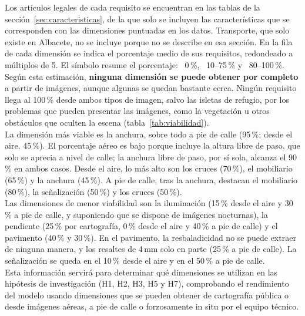 Los artículos legales de cada requisito se encuentran en las tablas de la sección~\ref{sec:caracteristicas}, de la que solo se incluyen las características que se corresponden con las dimensiones puntuadas en los datos. Transporte, que solo existe en Albacete, no se incluye porque no se describe en esa sección. En la fila de cada dimensión se indica el porcentaje medio de sus requisitos, redondeado a múltiplos de 5. El símbolo resume el porcentaje: ~0\,\%, ~10--75\,\% y ~80--100\,\%.
\\

Según esta estimación, \textbf{ninguna dimensión se puede obtener por completo} a partir de imágenes, aunque algunas se quedan bastante cerca. Ningún requisito llega al 100\,\% desde ambos tipos de imagen, salvo las isletas de refugio, por los problemas que pueden presentar las imágenes, como la vegetación u otros obstáculos que oculten la escena (tabla~\ref{tab:viabilidad}).
\\

La dimensión más viable es la anchura, sobre todo a pie de calle (95\,\%; desde el aire, 45\,\%). El porcentaje aéreo es bajo porque incluye la altura libre de paso, que solo se aprecia a nivel de calle; la anchura libre de paso, por sí sola, alcanza el 90\,\% en ambos casos. Desde el aire, lo más alto son los cruces (70\,\%), el mobiliario (65\,\%) y la anchura (45\,\%). A pie de calle, tras la anchura, destacan el mobiliario (80\,\%), la señalización (50\,\%) y los cruces (50\,\%).
\\

Las dimensiones de menor viabilidad son la iluminación (15\,\% desde el aire y 30\,\% a pie de calle, y suponiendo que se dispone de imágenes nocturnas), la pendiente (25\,\% por cartografía, 0\,\% desde el aire y 40\,\% a pie de calle) y el pavimento (40\,\% y 30\,\%). En el pavimento, la resbaladicidad no se puede extraer de ninguna manera, y los resaltes de 4\,mm solo en parte (25\,\% a pie de calle). La señalización se queda en el 10\,\% desde el aire y en el 50\,\% a pie de calle.
\\

Esta información servirá para determinar qué dimensiones se utilizan en las hipótesis de investigación (H1, H2, H3, H5 y H7), comprobando el rendimiento del modelo usando dimensiones que se pueden obtener de cartografía pública o desde imágenes aéreas, a pie de calle o forzosamente in situ por el equipo técnico.
\\

